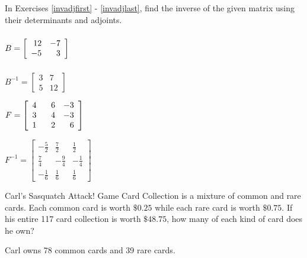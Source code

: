 \documentclass{ximera}
\begin{document}
\begin{question}
In Exercises \ref{invadjfirst} - \ref{invadjlast}, find the inverse of the given matrix using their determinants and adjoints.

\begin{problem}\label{invadjfirst}
$B = \left[ \begin{array}{rr} 12 & -7 \\ -5 & 3 \end{array} \right] \vphantom{\left[ \begin{array}{rrr} 4 & \hphantom{-}6 & -3 \\ 3 & 4 & -3 \\ 1 & 2 & 6 \end{array} \right]}$

\begin{solution}
$B^{-1} = \left[ \begin{array}{rr} 3 & 7 \\ 5 & 12 \end{array} \right]$
\end{solution}
\end{problem}

\begin{problem}\label{invadjlast}
$F = \left[ \begin{array}{rrr} 4 & \hphantom{-}6 & -3 \\ 3 & 4 & -3 \\ 1 & 2 & 6 \end{array} \right]$

\begin{solution}
$F^{-1} = \left[ \begin{array}{rrr} -\frac{5}{2} & \frac{7}{2} & \frac{1}{2} \\  \frac{7}{4} & -\frac{9}{4} & -\frac{1}{4} \\  -\frac{1}{6} & \frac{1}{6} & \frac{1}{6} \end{array} \right]$
\end{solution}
\end{problem}

\end{question}

\begin{problem}
Carl's Sasquatch Attack! Game Card Collection is a mixture of common and rare cards.  Each common card is worth $\$0.25$ while each rare card is worth $\$0.75$. If his entire 117 card collection is worth $\$48.75$, how many of each kind of card does he own?

\begin{solution}
Carl owns 78 common cards and 39 rare cards.
\end{solution}
\end{problem}
\end{document}
